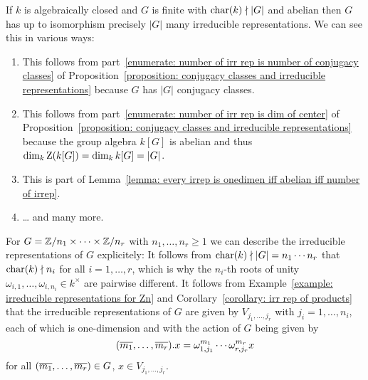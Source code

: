 \begin{example}
  \label{example: irrep of finite abelian groups}
  If $k$ is algebraically closed and $G$ is finite with $\operatorname{char}(k) \nmid |G|$ and abelian then $G$ has up to isomorphism precisely $|G|$ many irreducible representations.
  We can see this in various ways:
  \begin{enumerate}
    \item
      This follows from part~\ref*{enumerate: number of irr rep is number of conjugacy classes} of Proposition~\ref*{proposition: conjugacy classes and irreducible representations} because $G$ has $|G|$ conjugacy classes.
    \item
      This follows from part~\ref*{enumerate: number of irr rep is dim of center} of Proposition~\ref*{proposition: conjugacy classes and irreducible representations} because the group algebra $k[G]$ is abelian and thus $\dim_k \operatorname{Z}(k[G]) = \dim_k k[G] = |G|$.
    \item
      This is part of Lemma~\ref*{lemma: every irrep is onedimen iff abelian iff number of irrep}.
    \item
      {\dots} and many more.
  \end{enumerate}
  For $G = \mathbb{Z}/n_1 \times \dotsb \times \mathbb{Z}/n_r$ with $n_1, \dotsc, n_r \geq 1$ we can describe the irreducible representations of $G$ explicitely:
  It follows from $\operatorname{char}(k) \nmid |G| = n_1 \dotsm n_r$ that $\operatorname{char}(k) \nmid n_i$ for all $i = 1, \dotsc, r$, which is why the $n_i$-th roots of unity $\omega_{i,1}, \dotsc, \omega_{i,n_i} \in k^\times$ are pairwise different.
  It follows from Example~\ref{example: irreducible representations for Zn} and Corollary~\ref{corollary: irr rep of products} that the irreducible representations of $G$ are given by $V_{j_1, \dotsc, j_r}$ with $j_i = 1, \dotsc, n_i$, each of which is one-dimension and with the action of $G$ being given by
  \[
      (\overline{m_1}, \dotsc, \overline{m_r}) . x
    = \omega_{1,j_1}^{m_1} \dotsm \omega_{r,j_r}^{m_r} x
  \]
  for all $(\overline{m_1}, \dotsc, \overline{m_r}) \in G$, $x \in V_{j_1, \dotsc, j_r}$.
\end{example}




